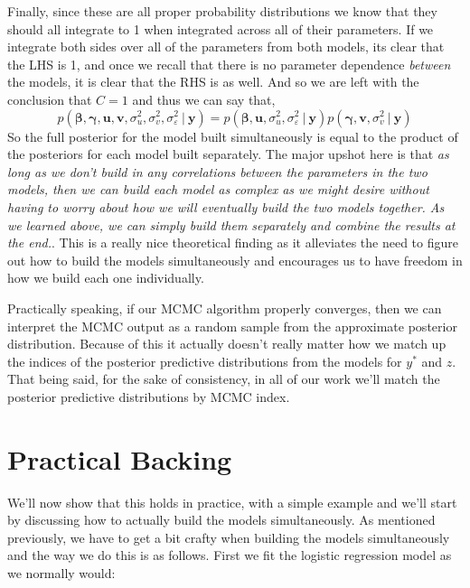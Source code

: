 \documentclass[12pt,twoside]{reedthesis}
\begin{document}
Finally, since these are all proper probability distributions we know that they should all integrate to 1 when integrated across all of their parameters. If we integrate both sides over all of the parameters from both models, its clear that the LHS is 1, and once we recall that there is no parameter dependence \emph{between} the models, it is clear that the RHS is as well. And so we are left with the conclusion that \(C = 1\) and thus we can say that,
\begin{equation}
p(\boldsymbol{\beta}, \boldsymbol{\gamma}, \mathbf{u}, \mathbf{v}, \sigma_u^2, \sigma_v^2, \sigma_{\varepsilon}^2\ | \ \mathbf{y})  = p(\boldsymbol{\beta}, \mathbf{u}, \sigma_u^2, \sigma_{\varepsilon}^2 \ | \ \mathbf{y})p(\boldsymbol{\gamma}, \mathbf{v}, \sigma_v^2 \ | \ \mathbf{y})
\label{eq:sepsimeq}
\end{equation}
So the full posterior for the model built simultaneously is equal to the product of the posteriors for each model built separately. The major upshot here is that \emph{as long as we don't build in any correlations between the parameters in the two models, then we can build each model as complex as we might desire without having to worry about how we will eventually build the two models together. As we learned above, we can simply build them separately and combine the results at the end.}. This is a really nice theoretical finding as it alleviates the need to figure out how to build the models simultaneously and encourages us to have freedom in how we build each one individually.

Practically speaking, if our MCMC algorithm properly converges, then we can interpret the MCMC output as a random sample from the approximate posterior distribution. Because of this it actually doesn't really matter how we match up the indices of the posterior predictive distributions from the models for \(y^*\) and \(z\). That being said, for the sake of consistency, in all of our work we'll match the posterior predictive distributions by MCMC index.

\hypertarget{practical-backing}{%
\section{Practical Backing}\label{practical-backing}}

We'll now show that this holds in practice, with a simple example and we'll start by discussing how to actually build the models simultaneously. As mentioned previously, we have to get a bit crafty when building the models simultaneously and the way we do this is as follows. First we fit the logistic regression model as we normally would:
\end{document}
